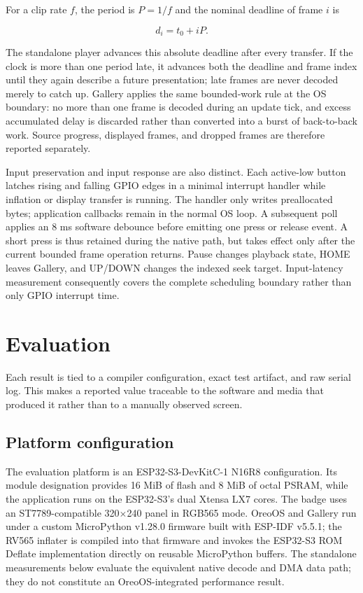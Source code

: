 \documentclass[11pt,twocolumn]{article}
\begin{document}
For a clip rate $f$, the period is $P=1/f$ and the nominal deadline of frame
$i$ is

\begin{equation}
d_i=t_0+iP.
\end{equation}

The standalone player advances this absolute deadline after every transfer.
If the clock is more than one period late, it advances both the deadline and
frame index until they again describe a future presentation; late frames are
never decoded merely to catch up.  Gallery applies the same bounded-work rule
at the OS boundary: no more than one frame is decoded during an update tick,
and excess accumulated delay is discarded rather than converted into a burst
of back-to-back work.  Source progress, displayed frames, and dropped frames
are therefore reported separately.

Input preservation and input response are also distinct.  Each active-low
button latches rising and falling GPIO edges in a minimal interrupt handler
while inflation or display transfer is running.  The handler only writes
preallocated bytes; application callbacks remain in the normal OS loop.  A
subsequent poll applies an 8 ms software debounce before emitting one press or
release event.  A short press is thus retained during the native path, but
takes effect only after the current bounded frame operation returns.  Pause
changes playback state, HOME leaves Gallery, and UP/DOWN changes the indexed
seek target.  Input-latency measurement consequently covers the complete
scheduling boundary rather than only GPIO interrupt time.

\section{Evaluation}

Each result is tied to a compiler configuration, exact test artifact, and raw
serial log.  This makes a reported value traceable to the software and media
that produced it rather than to a manually observed screen.

\subsection{Platform configuration}

The evaluation platform is an ESP32-S3-DevKitC-1 N16R8 configuration.  Its
module designation provides 16 MiB of flash and 8 MiB of octal PSRAM, while
the application runs on the ESP32-S3's dual Xtensa LX7 cores.  The badge uses
an ST7789-compatible 320$\times$240 panel in RGB565 mode.  OreoOS and Gallery
run under a custom MicroPython v1.28.0 firmware built with ESP-IDF v5.5.1; the
RV565 inflater is compiled into that firmware and invokes the ESP32-S3 ROM
Deflate implementation directly on reusable MicroPython buffers.  The
standalone measurements below evaluate the equivalent native decode and DMA
data path; they do not constitute an OreoOS-integrated performance result.
\end{document}
